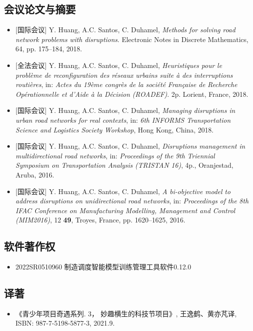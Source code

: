 \documentclass[letterpaper]{twentysecondcv} %
\begin{document}
\subsection{会议论文与摘要}
\begin{itemize}
    \item $[$国际会议$]$ Y. Huang, A.C. Santos, C. Duhamel, \textit{Methods for solving road network problems with disruptions}. Electronic Notes in Discrete Mathematics, 64, pp. 175--184, 2018.
    \item $[$全法会议$]$ Y. Huang, A.C. Santos, C. Duhamel, \textit{Heuristiques pour le problème de reconfiguration des réseaux urbains suite à des interruptions routières}, in: \textit{Actes du 19ème congrès de la société Française de Recherche Opérationnelle et d'Aide à la Décision (ROADEF)}. 2p. Lorient, France, 2018.
    \item $[$国际会议$]$ Y. Huang, A.C. Santos, C. Duhamel, \textit{Managing disruptions in urban road networks for real contexts}, in: \textit{6th INFORMS Transportation Science and Logistics Society Workshop}, Hong Kong, China, 2018.
    \item $[$国际会议$]$ Y. Huang, A.C. Santos, C. Duhamel, \textit{Disruptions management in multidirectional road networks}, in: \textit{Proceedings of the 9th Triennial Symposium on Transportation Analysis (TRISTAN 16)}, 4p., Oranjestad, Aruba, 2016.
    \item $[$国际会议$]$ Y. Huang, A.C. Santos, C. Duhamel, \textit{A bi-objective model to address disruptions on unidirectional road networks}, in: \textit{Proceedings of the 8th IFAC Conference on Manufacturing Modelling, Management and Control (MIM2016)}, 12 \textbf{49}, Troyes, France, pp. 1620--1625, 2016.
\end{itemize}

\vspace{-0.1cm}
\subsection{软件著作权}
\begin{itemize}
    \item 2022SR0510960 制造调度智能模型训练管理工具软件0.12.0
\end{itemize}

\vspace{-0.1cm}
\subsection{译著}
\begin{itemize}
    \item 《青少年项目奇遇系列. 3， 妙趣横生的科技节项目》, 王逸鹤、黄亦芃译, ISBN: 987-7-5198-5877-3, 2021.9.
\end{itemize}
\end{document}
